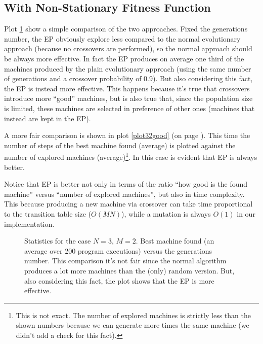 \documentclass{report}
\begin{document}
\subsection*{With Non-Stationary Fitness Function}
Plot \ref{plot32} show a simple comparison of the two approaches. %
Fixed the generations number, the EP obviously explore less compared to the normal evolutionary approach (because no crossovers are performed), so the normal approach should be always more effective. In fact the EP produces on average one third of the machines produced by the plain evolutionary approach (using the same number of generations and a crossover probability of 0.9).
But also considering this fact, the EP is instead more effective.
This happens because it's true that crossovers introduce more ``good'' machines, but is also true that, since the population size is limited, these machines are selected in preference of other ones (machines that instead are kept in the EP).

A more fair comparison is shown in plot \ref{plot32good} (on page \pageref{plot32good}). This time the number of steps of the best machine found (average) is plotted against the number of explored machines (average)\footnote{This is not exact. The number of explored machines is strictly less than the shown numbers because we can generate more times the same machine (we didn't add a check for this fact).}. In this case is evident that EP is always better.

Notice that EP is better not only in terms of the ratio ``how good is the found machine'' versus ``number of explored machines'', but also in time complexity. This because producing a new machine via crossover can take time proportional to the transition table size (\ie $O(MN)$), while a mutation is always $O(1)$ in our implementation.

\begin{figure}[t]
\centering
{}
\caption[]{Statistics for the case $N=3$, $M=2$. Best machine found (an average over 200 program executions) versus the generations number. This comparison it's not fair since the normal algorithm produces a lot more machines than the (only) random version. But, also considering this fact, the plot shows that the EP is more effective.}
\label{plot32}
\end{figure}
\end{document}
